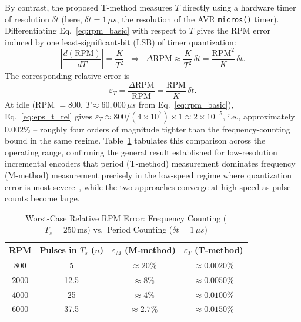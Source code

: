 \documentclass[journal, twocolumn]{IEEEtran}
\begin{document}
By contrast, the proposed T-method measures $T$ directly using a hardware timer of resolution $\delta t$ (here, $\delta t = 1\,\mu s$, the resolution of the AVR \texttt{micros()} timer). Differentiating Eq.~\eqref{eq:rpm_basic} with respect to $T$ gives the RPM error induced by one least-significant-bit (LSB) of timer quantization:
\begin{equation}
\left|\frac{d(\text{RPM})}{dT}\right| = \frac{K}{T^2} \;\;\Rightarrow\;\; \Delta\text{RPM} \approx \frac{K}{T^2}\,\delta t = \frac{\text{RPM}^2}{K}\,\delta t.
\label{eq:eps_t}
\end{equation}
The corresponding relative error is
\begin{equation}
\varepsilon_{T} = \frac{\Delta\text{RPM}}{\text{RPM}} = \frac{\text{RPM}}{K}\,\delta t.
\label{eq:eps_t_rel}
\end{equation}
At idle (RPM $=800$, $T \approx 60{,}000\,\mu s$ from Eq.~\eqref{eq:rpm_basic}), Eq.~\eqref{eq:eps_t_rel} gives $\varepsilon_T \approx 800/(4\times10^{7})\times1 \approx 2\times10^{-5}$, i.e., approximately $0.002\%$ -- roughly four orders of magnitude tighter than the frequency-counting bound in the same regime. Table~\ref{tab:error_compare} tabulates this comparison across the operating range, confirming the general result established for low-resolution incremental encoders that period (T-method) measurement dominates frequency (M-method) measurement precisely in the low-speed regime where quantization error is most severe~\cite{petrella2007,mtmethod2017}, while the two approaches converge at high speed as pulse counts become large.

\begin{table}[!ht]
\centering
\caption{Worst-Case Relative RPM Error: Frequency Counting ($T_s=250\,\text{ms}$) vs.\ Period Counting ($\delta t = 1\,\mu s$)}
\label{tab:error_compare}
\begin{tabular}{@{}cccc@{}}
\toprule
RPM & Pulses in $T_s$ ($n$) & $\varepsilon_{M}$ (M-method) & $\varepsilon_{T}$ (T-method) \\
\midrule
800   & 5   & $\approx 20\%$    & $\approx 0.0020\%$ \\
2000  & 12.5 & $\approx 8\%$    & $\approx 0.0050\%$ \\
4000  & 25  & $\approx 4\%$     & $\approx 0.0100\%$ \\
6000  & 37.5 & $\approx 2.7\%$  & $\approx 0.0150\%$ \\
\bottomrule
\end{tabular}
\end{table}
\end{document}
